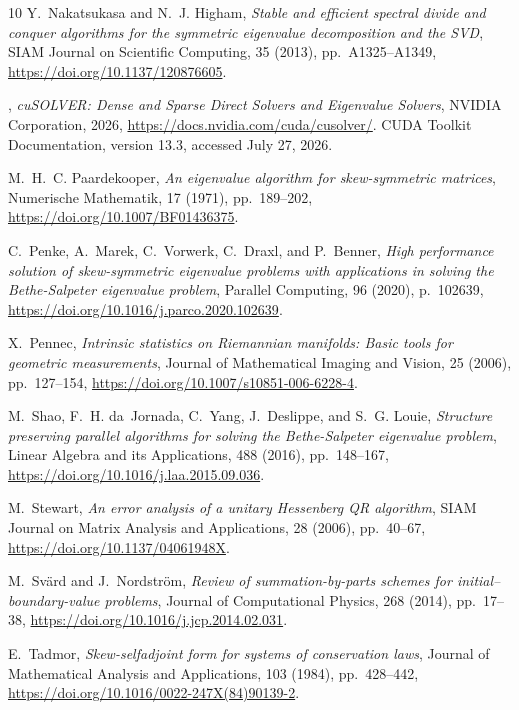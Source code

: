 \documentclass[final,onefignum,onetabnum,dvipsnames]{siamart251216}
\numberwithin{algorithm}{section}
\numberwithin{equation}{section}
\begin{document}
\begin{thebibliography}{10}
{\sc Y.~Nakatsukasa and N.~J. Higham}, {\em Stable and efficient spectral divide and conquer algorithms for the symmetric eigenvalue decomposition and the {SVD}}, SIAM Journal on Scientific Computing, 35 (2013), pp.~A1325--A1349, \url{https://doi.org/10.1137/120876605}.

{}, {\em {cuSOLVER}: Dense and Sparse Direct Solvers and Eigenvalue Solvers}, NVIDIA Corporation, 2026, \url{https://docs.nvidia.com/cuda/cusolver/}.
\newblock CUDA Toolkit Documentation, version 13.3, accessed July 27, 2026.

{\sc M.~H.~C. Paardekooper}, {\em An eigenvalue algorithm for skew-symmetric matrices}, Numerische Mathematik, 17 (1971), pp.~189--202, \url{https://doi.org/10.1007/BF01436375}.

{\sc C.~Penke, A.~Marek, C.~Vorwerk, C.~Draxl, and P.~Benner}, {\em High performance solution of skew-symmetric eigenvalue problems with applications in solving the {B}ethe-{S}alpeter eigenvalue problem}, Parallel Computing, 96 (2020), p.~102639, \url{https://doi.org/10.1016/j.parco.2020.102639}.

{\sc X.~Pennec}, {\em Intrinsic statistics on {R}iemannian manifolds: Basic tools for geometric measurements}, Journal of Mathematical Imaging and Vision, 25 (2006), pp.~127--154, \url{https://doi.org/10.1007/s10851-006-6228-4}.

{\sc M.~Shao, F.~H. da~Jornada, C.~Yang, J.~Deslippe, and S.~G. Louie}, {\em Structure preserving parallel algorithms for solving the {B}ethe-{S}alpeter eigenvalue problem}, Linear Algebra and its Applications, 488 (2016), pp.~148--167, \url{https://doi.org/10.1016/j.laa.2015.09.036}.

{\sc M.~Stewart}, {\em An error analysis of a unitary {H}essenberg {QR} algorithm}, SIAM Journal on Matrix Analysis and Applications, 28 (2006), pp.~40--67, \url{https://doi.org/10.1137/04061948X}.

{\sc M.~Sv{\"a}rd and J.~Nordstr{\"o}m}, {\em Review of summation-by-parts schemes for initial--boundary-value problems}, Journal of Computational Physics, 268 (2014), pp.~17--38, \url{https://doi.org/10.1016/j.jcp.2014.02.031}.

{\sc E.~Tadmor}, {\em Skew-selfadjoint form for systems of conservation laws}, Journal of Mathematical Analysis and Applications, 103 (1984), pp.~428--442, \url{https://doi.org/10.1016/0022-247X(84)90139-2}.


\end{thebibliography}
\end{document}
